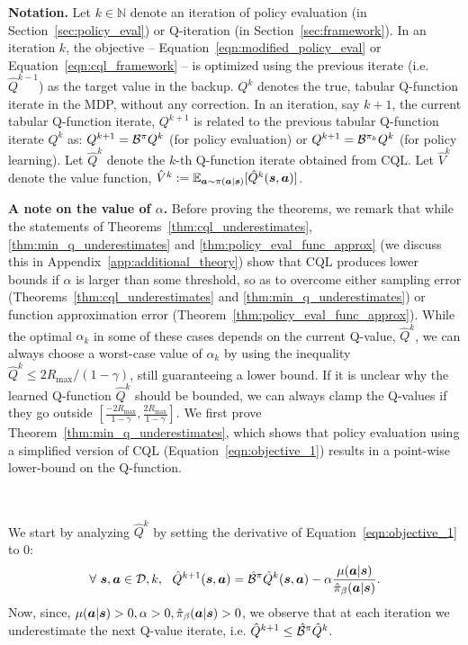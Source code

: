 \textbf{Notation.} Let $k \in \mathbb{N}$ denote an iteration of policy evaluation (in Section~\ref{sec:policy_eval}) or Q-iteration (in Section~\ref{sec:framework}). In an iteration $k$, the objective -- Equation~\ref{eqn:modified_policy_eval} or Equation~\ref{eqn:cql_framework} -- is optimized using the previous iterate (i.e. $\hat{Q}^{k-1}$) as the target value in the backup. $Q^k$ denotes the true, tabular Q-function iterate in the MDP, without any correction. In an iteration, say $k+1$, the current tabular Q-function iterate, $Q^{k+1}$ is related to the previous tabular Q-function iterate ${Q}^k$ as: $Q^{k+1} = \mathcal{B}^{\pi} Q^k$ (for policy evaluation) or $Q^{k+1} = \mathcal{B}^{\pi_k} Q^k$ (for policy learning). Let $\hat{Q}^k$ denote the $k$-th Q-function iterate obtained from CQL. Let $\hat{V}^k$ denote the value function, $\hat{V}^k := \mathbb{E}_{\boldsymbol{a} \sim \pi(\boldsymbol{a}|\boldsymbol{s})}[\hat{Q}^k(\boldsymbol{s}, \boldsymbol{a})]$.   

\textbf{A note on the value of $\alpha$.} Before proving the theorems, we remark that while the statements of Theorems~\ref{thm:cql_underestimates}, \ref{thm:min_q_underestimates} and \ref{thm:policy_eval_func_approx} (we discuss this in Appendix~\ref{app:additional_theory}) show that CQL produces lower bounds if $\alpha$ is larger than some threshold, so as to overcome either sampling error (Theorems~\ref{thm:cql_underestimates} and \ref{thm:min_q_underestimates}) or function approximation error (Theorem~\ref{thm:policy_eval_func_approx}). While the optimal $\alpha_k$ in some of these cases depends on the current Q-value, $\hat{Q}^k$, we can always choose a worst-case value of $\alpha_k$ by using the inequality $\hat{Q}^k \leq 2 R_{\max}/(1 - \gamma)$, still guaranteeing a lower bound. If it is unclear why the learned Q-function $\hat{Q}^k$ should be bounded, we can always clamp the Q-values if they go outside $\left[ \frac{-2 R_{\max}}{1 - \gamma}, \frac{2 R_{\max}}{1 - \gamma} \right]$.
We first prove Theorem~\ref{thm:min_q_underestimates}, which shows that policy evaluation using a simplified version of CQL (Equation~\ref{eqn:objective_1}) results in a point-wise lower-bound on the Q-function. 

~



We start by analyzing $\hat{Q}^k$ by setting the derivative of Equation~\ref{eqn:objective_1} to 0:
\begin{equation}
    \forall~\boldsymbol{s}, \boldsymbol{a} \in \mathcal{D}, k, ~~ \hat{Q}^{k+1}(\boldsymbol{s}, \boldsymbol{a}) = \hat{\mathcal{B}}^\pi \hat{Q}^k(\boldsymbol{s}, \boldsymbol{a}) - \alpha \frac{\mu(\boldsymbol{a}|\boldsymbol{s})}{\hat{\pi}_\beta(\boldsymbol{a}|\boldsymbol{s})}.
    \label{eqn:q_expression_objective1}
\end{equation}
Now, since, $\mu(\boldsymbol{a}|\boldsymbol{s}) > 0, \alpha > 0, \hat{\pi}_\beta(\boldsymbol{a}|\boldsymbol{s}) > 0$, we observe that at each iteration we underestimate the next Q-value iterate, i.e. $\hat{Q}^{k+1} \leq \hat{\mathcal{B}}^\pi \hat{Q}^k$.

